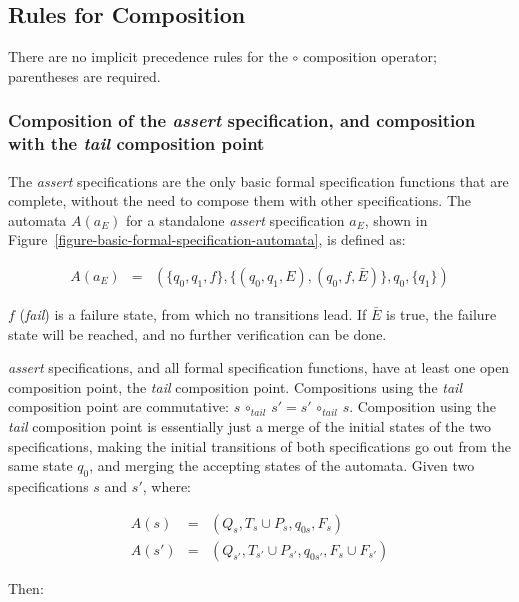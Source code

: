 \documentclass[a4paper,11pt]{kth-mag}
\begin{document}
\subsection{Rules for Composition} \label{section-approach-composition}
\lstset{language=Python,numbers=none}


There are no implicit precedence rules for the $\circ$ composition operator;
parentheses are required.


\subsubsection{Composition of the \textit{assert} specification, and
composition with the \textit{tail} composition point}

The \textit{assert} specifications are the only basic formal specification
functions that are complete, without the need to compose them with other
specifications. The automata $A(a_E)$ for a standalone \textit{assert}
specification $a_E$, shown in
Figure~\ref{figure-basic-formal-specification-automata}, is defined as:

\[
  \begin{array}{rcl}
    A(a_E) & = & (\{q_0, q_1, f\}, \{(q_0, q_1, E),(q_0, f, \bar{E})\}, q_0, \{q_1\})
  \end{array}
\]

$f$ (\textit{fail}) is a failure state, from which no transitions lead. If
$\bar{E}$ is true, the failure state will be reached, and no further
verification can be done.

\textit{assert} specifications, and all formal specification functions, have at
least one open composition point, the \textit{tail} composition point.
Compositions using the \textit{tail} composition point are commutative: $s \,
\circ_{tail} \, s' = s' \, \circ_{tail} \, s$. Composition using the
\textit{tail} composition point is essentially just a merge of the initial
states of the two specifications, making the initial transitions of both
specifications go out from the same state $q_0$, and merging the accepting
states of the automata. Given two specifications $s$ and $s'$, where:

\[
  \begin{array}{rcl}
    A(s) & = & (Q_s, T_s \cup P_s, q_{0s}, F_s) \\
   A(s') & = & (Q_{s'}, T_{s'} \cup P_{s'}, q_{0s'}, F_s \cup F_{s'})
  \end{array}
\]

Then:
\end{document}
